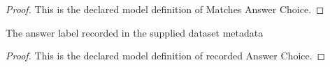 \begin{proof}
  This is the declared model definition of Matches Answer Choice.
\end{proof}
\begin{definition}
  \label{def:physics:phyx-mini-0171:phyxminiproblems-problemphyxmini0171-recordedanswerchoice}
  The answer label recorded in the supplied dataset metadata
\end{definition}
\begin{proof}
  This is the declared model definition of recorded Answer Choice.
\end{proof}
